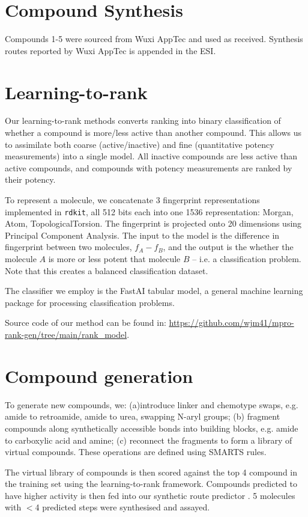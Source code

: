 \section{Compound Synthesis}

Compounds 1-5 were sourced from Wuxi AppTec and used as received. Synthesis routes reported by Wuxi AppTec is appended in the ESI. 


\section{Learning-to-rank} 

Our learning-to-rank methods converts ranking into binary classification of whether a compound is more/less active than another compound. This allows us to assimilate both coarse (active/inactive) and fine (quantitative potency measurements) into a single model. All inactive compounds are less active than active compounds, and compounds with potency measurements are ranked by their potency.  

To represent a molecule, we concatenate 3 fingerprint representations implemented in \texttt{rdkit}, all 512 bits each into one 1536 representation: Morgan, Atom, TopologicalTorsion. The fingerprint is projected onto 20 dimensions using Principal Component Analysis. The input to the model is the difference in fingerprint between two molecules, $f_A - f_B$, and the output is the whether the molecule $A$ is more or less potent that molecule $B$ -- i.e. a classification problem. Note that this creates a balanced classification dataset.  

The classifier we employ is the FastAI tabular model, a general machine learning package for processing classification problems. 

Source code of our method can be found in: \url{https://github.com/wjm41/mpro-rank-gen/tree/main/rank_model}.  

\section{Compound generation} 
To generate new compounds, we: (a)introduce linker and chemotype swaps, e.g. amide to retroamide, amide to urea, swapping N-aryl groups; (b) fragment compounds along synthetically accessible bonds into building blocks, e.g. amide to carboxylic acid and amine; (c) reconnect the fragments to form a library of virtual compounds. These operations are defined using SMARTS rules. 

The virtual library of compounds is then scored against the top 4 compound in the training set using the learning-to-rank framework. Compounds predicted to have higher activity is then fed into our synthetic route predictor \cite{schwaller2019molecular,yang2019molecular}. 5 molecules with $<$4 predicted steps were synthesised and assayed. 


